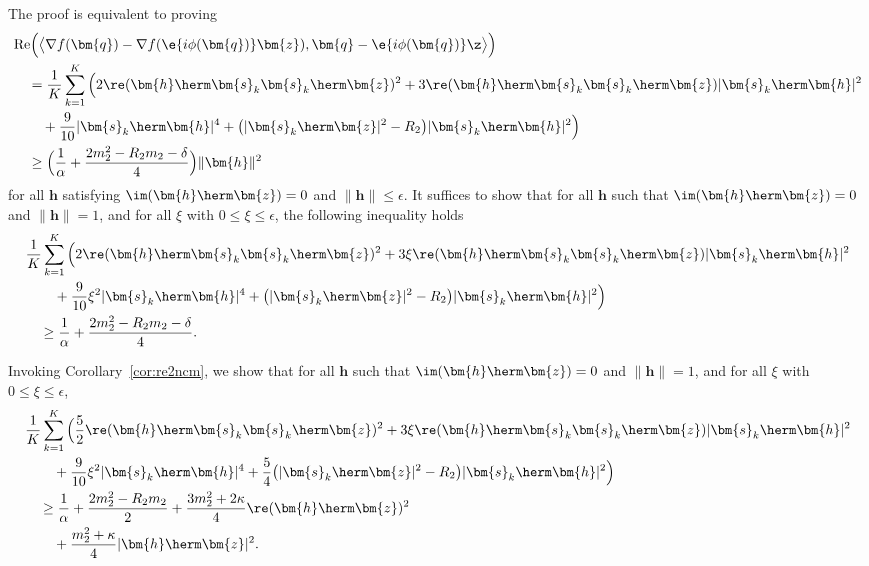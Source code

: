 The proof is equivalent to proving
\begin{align}
	&\mathrm{Re}\Big( \big\langle\nabla f(\bm{q})-\nabla f(\e{i\phi(\bm{q})}\bm{z}), \bm{q} - \e{i\phi(\bm{q})}\z\big\rangle\Big)\nonumber\\
	&\quad=\frac{1}{K}\sum_{k=1}^K\Big(2\re(\bm{h}\herm\bm{s}_k\bm{s}_k\herm\bm{z})^2+3\re(\bm{h}\herm\bm{s}_k\bm{s}_k\herm\bm{z})|\bm{s}_k\herm\bm{h}|^2\nonumber\\
	&\qquad+\frac{9}{10}|\bm{s}_k\herm\bm{h}|^4+
	\big(|\bm{s}_k\herm\bm{z}|^2-R_2\big)|\bm{s}_k\herm\bm{h}|^2\Big)
	\nonumber\\
	&\quad\geq \Big( \frac{1}{\alpha}+\frac{2  m_2^2-R_2  m_2-\delta}{4}\Big)\|\bm{h}\|^2\nonumber
\end{align}
for all $\bm{h}$ satisfying $\im(\bm{h}\herm\bm{z})=0$ and $\|\bm{h}\|\leq\epsilon$. 
It suffices to show that for all $\bm{h}$ such that $\im(\bm{h}\herm\bm{z})=0$ and $\|\bm{h}\|=1$, and for all $\xi$ with $0\leq \xi\leq \epsilon$, the following inequality holds
\begin{align}
	&\frac{1}{K}\sum_{k=1}^K\Big(2\re(\bm{h}\herm\bm{s}_k\bm{s}_k\herm\bm{z})^2+3\xi\re(\bm{h}\herm\bm{s}_k\bm{s}_k\herm\bm{z})|\bm{s}_k\herm\bm{h}|^2\nonumber\\
	&\qquad+\frac{9}{10}\xi^2|\bm{s}_k\herm\bm{h}|^4+
	\big(|\bm{s}_k\herm\bm{z}|^2-R_2\big)|\bm{s}_k\herm\bm{h}|^2\Big)\nonumber\\
	&\quad \geq \frac{1}{\alpha}+\frac{2  m_2^2-R_2  m_2-\delta}{4}. \nonumber
\end{align}

Invoking Corollary~\ref{cor:re2ncm}, we show that for all $\bm{h}$ such that $\im(\bm{h}\herm\bm{z})=0$ and $\|\bm{h}\|=1$, and for all $\xi$ with $0\leq \xi\leq \epsilon$,
\begin{align}
	&\frac{1}{K}\sum_{k=1}^K\Big(\frac{5}{2}\re(\bm{h}\herm\bm{s}_k\bm{s}_k\herm\bm{z})^2+3\xi\re(\bm{h}\herm\bm{s}_k\bm{s}_k\herm\bm{z})|\bm{s}_k\herm\bm{h}|^2
	\nonumber\\&\qquad
	+\frac{9}{10}\xi^2|\bm{s}_k\herm\bm{h}|^4+
	\frac{5}{4}\big(|\bm{s}_k\herm\bm{z}|^2-R_2\big)|\bm{s}_k\herm\bm{h}|^2\Big)
	\nonumber\\&\quad
	\geq  \frac{1}{\alpha}+\frac{2m_2^2-R_2m_2}{2} +\frac{3m_2^2+2\kappa}{4}\re(\bm{h}\herm\bm{z})^2
	\nonumber\\&\qquad
	+\frac{m_2^2+\kappa}{4}|\bm{h}\herm\bm{z}|^2. \label{eqn:llc_lemma_proof}
\end{align}

